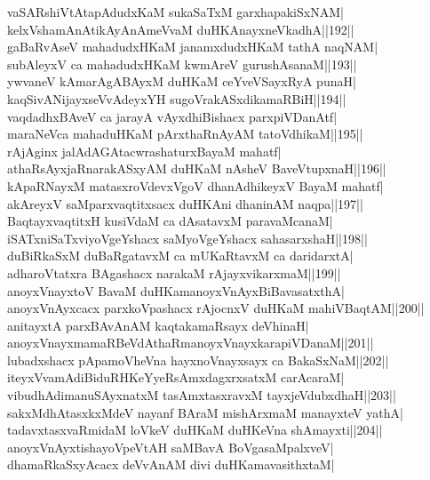 \documentclass{article}
\begin{document}
vaSARshiVtAtapAdudxKaM sukaSaTxM garxhapakiSxNAM|\\
kelxVshamAnAtikAyAnAmeVvaM duHKAnayxneVkadhA||192||\\
gaBaRvAseV mahadudxHKaM janamxdudxHKaM tathA naqNAM|\\
subAleyxV ca mahadudxHKaM kwmAreV gurushAsanaM||193||\\
ywvaneV kAmarAgABAyxM duHKaM ceYveVSayxRyA punaH|\\
kaqSivANijayxseVvAdeyxYH sugoVrakASxdikamaRBiH||194||\\
vaqdadhxBAveV ca jarayA vAyxdhiBishacx parxpiVDanAtf|\\
maraNeVca mahaduHKaM pArxthaRnAyAM tatoVdhikaM||195||\\
rAjAginx jalAdAGAtacwrashaturxBayaM mahatf|\\
athaRsAyxjaRnarakASxyAM duHKaM nAsheV BaveVtupxnaH||196||\\
kApaRNayxM matasxroVdevxVgoV dhanAdhikeyxV BayaM mahatf|\\
akAreyxV saMparxvaqtitxsacx duHKAni dhaninAM naqpa||197||\\
BaqtayxvaqtitxH kusiVdaM ca dAsatavxM paravaMcanaM|\\
iSATxniSaTxviyoVgeYshacx saMyoVgeYshacx sahasarxshaH||198||\\
duBiRkaSxM duBaRgatavxM ca mUKaRtavxM ca daridarxtA|\\
adharoVtatxra BAgashacx narakaM rAjayxvikarxmaM||199||\\
anoyxVnayxtoV BavaM duHKamanoyxVnAyxBiBavasatxthA|\\
anoyxVnAyxcacx parxkoVpashacx rAjocnxV duHKaM mahiVBaqtAM||200||\\
anitayxtA parxBAvAnAM kaqtakamaRsayx deVhinaH|\\
anoyxVnayxmamaRBeVdAthaRmanoyxVnayxkarapiVDanaM||201||\\
lubadxshacx pApamoVheVna hayxnoVnayxsayx ca BakaSxNaM||202||\\
iteyxVvamAdiBiduRHKeYyeRsAmxdagxrxsatxM carAcaraM|\\
vibudhAdimanuSAyxnatxM tasAmxtasxravxM tayxjeVdubxdhaH||203||\\
sakxMdhAtasxkxMdeV nayanf BAraM mishArxmaM manayxteV yathA|\\
tadavxtasxvaRmidaM loVkeV duHKaM duHKeVna shAmayxti||204||\\
anoyxVnAyxtishayoVpeVtAH saMBavA BoVgasaMpalxveV|\\
dhamaRkaSxyAcacx deVvAnAM divi duHKamavasithxtaM|\\
\end{document}
